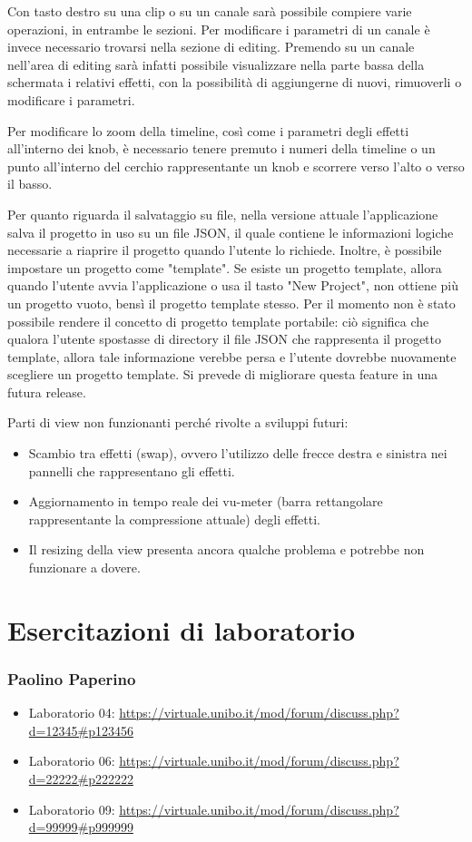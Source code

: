 \documentclass[a4paper,12pt]{report}
\begin{document}
Con tasto destro su una clip o su un canale sarà possibile compiere varie operazioni, in entrambe le sezioni. Per modificare i parametri di un canale è invece necessario trovarsi nella sezione di editing. Premendo su un canale nell’area di editing sarà infatti possibile visualizzare nella parte bassa della schermata i relativi effetti, con la possibilità di aggiungerne di nuovi, rimuoverli o modificare i parametri. 

Per modificare lo zoom della timeline, così come i parametri degli effetti all’interno dei knob, è necessario tenere premuto i numeri della timeline o un punto all’interno del cerchio rappresentante un knob e scorrere verso l’alto o verso il basso.

Per quanto riguarda il salvataggio su file, nella versione attuale l'applicazione salva il progetto in uso su un file JSON, il quale contiene le informazioni logiche necessarie a riaprire il progetto quando l'utente lo richiede. Inoltre, è possibile impostare un progetto come "template". Se esiste un progetto template, allora quando l'utente avvia l'applicazione o usa il tasto "New Project", non ottiene più un progetto vuoto, bensì il progetto template stesso. Per il momento non è stato possibile rendere il concetto di progetto template portabile: ciò significa che qualora l'utente spostasse di directory il file JSON che rappresenta il progetto template, allora tale informazione verebbe persa e l'utente dovrebbe nuovamente scegliere un progetto template. Si prevede di migliorare questa feature in una futura release. 

Parti di view non funzionanti perché rivolte a sviluppi futuri:
\begin{itemize}
    \item Scambio tra effetti (swap), ovvero l'utilizzo delle frecce destra e sinistra nei pannelli che rappresentano gli effetti.
    \item Aggiornamento in tempo reale dei vu-meter (barra rettangolare rappresentante la compressione attuale) degli effetti.
    \item Il resizing della view presenta ancora qualche problema e potrebbe non funzionare a dovere. 
\end{itemize}

\chapter{Esercitazioni di laboratorio}

\subsection{Paolino Paperino}

\begin{itemize}
 \item Laboratorio 04: \url{https://virtuale.unibo.it/mod/forum/discuss.php?d=12345#p123456}
 \item Laboratorio 06: \url{https://virtuale.unibo.it/mod/forum/discuss.php?d=22222#p222222}
 \item Laboratorio 09: \url{https://virtuale.unibo.it/mod/forum/discuss.php?d=99999#p999999}
\end{itemize}
\end{document}
